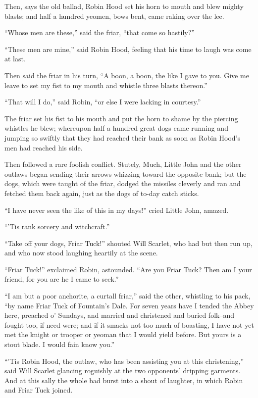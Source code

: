 Then, says the old ballad, Robin Hood set his horn to mouth and blew
mighty blasts; and half a hundred yeomen, bows bent, came raking over
the lee.

``Whose men are these,'' said the friar, ``that come so hastily?''

``These men are mine,'' said Robin Hood, feeling that his time to laugh
was come at last.

Then said the friar in his turn, ``A boon, a boon, the like I gave to
you. Give me leave to set my fist to my mouth and whistle three blasts
thereon.''

``That will I do,'' said Robin, ``or else I were lacking in courtesy.''

The friar set his fist to his mouth and put the horn to shame by the
piercing whistles he blew; whereupon half a hundred great dogs came
running and jumping so swiftly that they had reached their bank as soon
as Robin Hood's men had reached his side.

Then followed a rare foolish conflict. Stutely, Much, Little John and
the other outlaws began sending their arrows whizzing toward the
opposite bank; but the dogs, which were taught of the friar, dodged the
missiles cleverly and ran and fetched them back again, just as the dogs
of to-day catch sticks.

``I have never seen the like of this in my days!'' cried Little John,
amazed.

``'Tis rank sorcery and witchcraft.''

``Take off your dogs, Friar Tuck!'' shouted Will Scarlet, who had but
then run up, and who now stood laughing heartily at the scene.

``Friar Tuck!'' exclaimed Robin, astounded. ``Are you Friar Tuck? Then
am I your friend, for you are he I came to seek.''

``I am but a poor anchorite, a curtall friar,'' said the other,
whistling to his pack, ``by name Friar Tuck of Fountain's Dale. For
seven years have I tended the Abbey here, preached o' Sundays, and
married and christened and buried folk--and fought too, if need were;
and if it smacks not too much of boasting, I have not yet met the knight
or trooper or yeoman that I would yield before. But yours is a stout
blade. I would fain know you.''

``'Tis Robin Hood, the outlaw, who has been assisting you at this
christening,'' said Will Scarlet glancing roguishly at the two
opponents' dripping garments. And at this sally the whole bad burst into
a shout of laughter, in which Robin and Friar Tuck joined.

